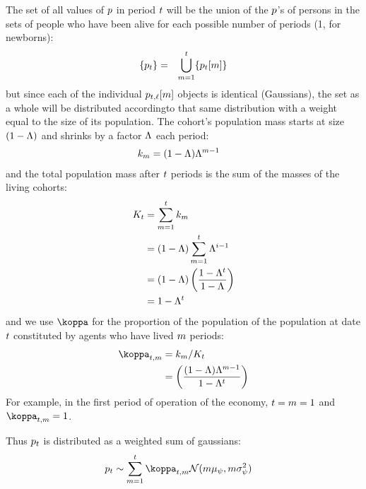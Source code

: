 \documentclass[\econtexRoot/BufferStockTheory.tex]{subfiles}
\begin{document}
\newpage
The set of all values of $p$ in period $t$ will be the union of the $p$'s of persons in the sets of people who have been alive for each possible number of periods (1, for newborns):
\begin{eqnarray}
  \{p_{t}\} & = & \bigcup_{m=1}^{t}\{p_{t}[m]\}
\end{eqnarray}
but since each of the individual $p_{t,\ell}[m]$ objects is identical (Gaussians), the set as a whole will be distributed accordingto that same distribution with a weight equal to the size of its population.  The cohort's population mass starts at size $(1-\Lambda)$ and shrinks by a factor $\Lambda$ each period:
\begin{align}
  k_{m} & =  (1-\Lambda)\Lambda^{m-1} \label{eq:mass}
\end{align}
and the total population mass after $t$ periods is the sum of the masses of the living cohorts:
\begin{align*}
  K_{t} & =  \sum_{m=1}^{t}k_{m}
  \\ & =  (1-\Lambda)\sum_{m=1}^{t}\Lambda^{i-1}
  \\ & =  (1-\Lambda)\left(\frac{1-\Lambda^{t}}{1-\Lambda}\right)
  \\ & = 1-\Lambda^{t}
\end{align*}
and we use $\wgt$ for the proportion of the population of the population at date $t$ constituted by agents who have lived $m$ periods:
\begin{align}
  \wgt_{\FutPer,\LooPer} & =  \mass_{\LooPer}/\Mass_{\FutPer} \label{eq:wgt}
  \\ & = \left(\frac{(1-\Liv)\Liv^{\LooPer-1}}{1-\Liv^{\FutPer}}\right) \notag
\end{align}
For example, in the first period of operation of the economy, $t=m=1$ and $\wgt_{\FutPer,\LooPer}=1$.

Thus $p_{t}$ is distributed as a weighted sum of gaussians:
\begin{align}
  \pLog_{\FutPer} & \sim \sum_{\LooPer=1}^{\FutPer}\wgt_{\FutPer,\LooPer}\mathcal{N}(\LooPer \pShkMean,\LooPer \sigma^{2}_{\DnsShk})
\end{align}
\end{document}
